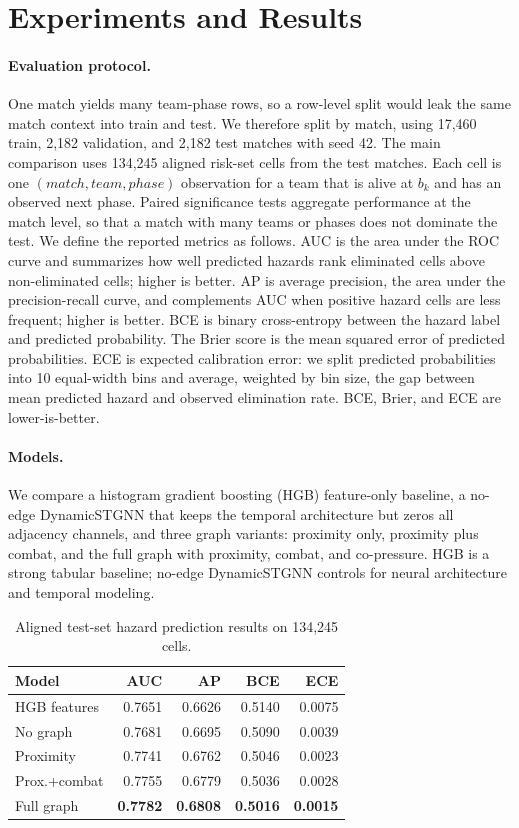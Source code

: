 \section{Experiments and Results}
\label{sec:results}

\paragraph{Evaluation protocol.}
One match yields many team-phase rows, so a row-level split would leak the
same match context into train and test. We therefore split by match, using
17,460 train, 2,182 validation, and 2,182 test matches with seed 42. The main
comparison uses 134,245 aligned risk-set cells from the test matches. Each
cell is one \((match, team, phase)\) observation for a team that is alive at
\(b_k\) and has an observed next phase. Paired significance tests aggregate
performance at the match level, so that a match with many teams or phases
does not dominate the test.
We define the reported metrics as follows. AUC is the area under the ROC curve and summarizes how
well predicted hazards rank eliminated cells above non-eliminated cells; higher
is better. AP is average precision, the area under the precision-recall curve,
and complements AUC when positive hazard cells are less frequent; higher is
better. BCE is binary cross-entropy between the hazard label and predicted
probability. The Brier score is the mean squared error of predicted
probabilities. ECE is expected calibration error: we split predicted
probabilities into 10 equal-width bins and average, weighted by bin size, the
gap between mean predicted hazard and observed elimination rate. BCE, Brier,
and ECE are lower-is-better.

\paragraph{Models.}
We compare a histogram gradient boosting (HGB) feature-only baseline, a
no-edge DynamicSTGNN that keeps the temporal architecture but zeros all
adjacency channels, and three graph variants: proximity only, proximity plus
combat, and the full graph with proximity, combat, and co-pressure. HGB is a
strong tabular baseline; no-edge DynamicSTGNN controls for neural
architecture and temporal modeling.

\begin{table}[htbp]
\centering
\caption{Aligned test-set hazard prediction results on 134,245 cells.}
\label{tab:main}
\small
\begin{tabular}{lrrrr}
\toprule
Model & AUC & AP & BCE & ECE \\
\midrule
HGB features & 0.7651 & 0.6626 & 0.5140 & 0.0075 \\
No graph & 0.7681 & 0.6695 & 0.5090 & 0.0039 \\
Proximity & 0.7741 & 0.6762 & 0.5046 & 0.0023 \\
Prox.+combat & 0.7755 & 0.6779 & 0.5036 & 0.0028 \\
Full graph & \textbf{0.7782} & \textbf{0.6808} & \textbf{0.5016} & \textbf{0.0015} \\
\bottomrule
\end{tabular}
\end{table}


